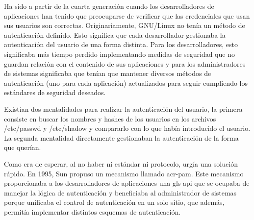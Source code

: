 \documentclass[titlepage, 12pt, a4paper]{article}
\begin{document}
Ha sido a partir de la cuarta generación cuando los desarrolladores de aplicaciones han tenido que preocuparse de verificar que las credenciales que usan sus usuarios son correctas. Originariamente, \gls{GNU/Linux} no tenía un método de autenticación definido. Esto significa que cada desarrollador gestionaba la autenticación del usuario de una forma distinta. Para los desarrolladores, esto significaba más tiempo perdido implementando medidas de seguridad que no guardan relación con el contenido de sus aplicaciones y para los administradores de sistemas significaba que tenían que mantener diversos métodos de autenticación (uno para cada aplicación) actualizados para seguir cumpliendo los estándares de seguridad deseados. \par
Existían dos mentalidades para realizar la autenticación del usuario, la primera consiste en buscar los nombres y hashes de los usuarios en los archivos /etc/passwd y /etc/shadow y compararlo con lo que había introducido el usuario. La segunda mentalidad directamente gestionaban la autenticación de la forma que querían. \par
Como era de esperar, al no haber ni estándar ni protocolo, urgía una solución rápido. En 1995, \gls{Sun} propuso un mecanismo llamado \gls{acr-pam}. Este mecanismo proporcionaba a los desarrolladores de aplicaciones una \gls{gls-api} que se ocupaba de manejar la lógica de autenticación y beneficiaba al administrador de sistemas porque unificaba el control de autenticación en un solo sitio, que además, permitía implementar distintos esquemas de autenticación.
\end{document}

